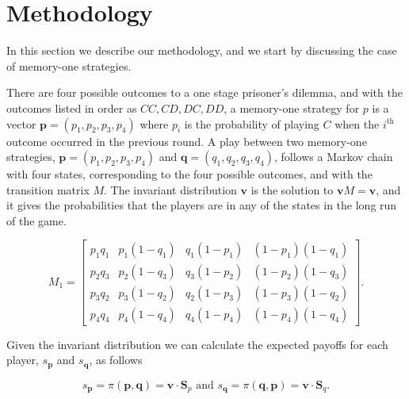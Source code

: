 \documentclass{article}
\theoremstyle{definition}
\begin{document}
\section{Methodology}\label{section:methodology}

In this section we describe our methodology, and we start by discussing
the case of memory-one strategies.

There are four possible outcomes to a one stage prisoner's dilemma, and with the
outcomes listed in order as \(CC, CD, DC, DD\), a memory-one strategy for \(p\)
is a vector \(\mathbf{p} = (p_1, p_2, p_3, p_4)\) where \(p_i\) is the
probability of playing \(C\) when the \(i^{\text{th}}\) outcome occurred in the
previous round. A play between two memory-one strategies, \(\mathbf{p} = (p_1,
p_2, p_3, p_4)\) and \(\mathbf{q} = (q_1, q_2, q_3, q_4)\), follows a Markov
chain with four states, corresponding to the four possible outcomes, and with
the transition matrix \(M\). The invariant distribution \(\mathbf{v}\) is the
solution to \(\mathbf{v} M = \mathbf{v}\), and it gives the probabilities that
the players are in any of the states in the long run of the game.

\begin{equation}
\displaystyle M_1 = \left[\begin{matrix}p_{1} q_{1} & p_{1} \left(1 \!- \!q_{1}\right) & q_{1} \left(1 \!- \!p_{1}\right) & \left(1 \!- \!p_{1}\right) \left(1 \!- \!q_{1}\right)\\
  p_{2} q_{3} & p_{2} \left(1 \!- \!q_{3}\right) & q_{3} \left(1 \!- \!p_{2}\right) & \left(1 \!- \!p_{2}\right) \left(1 \!- \!q_{3}\right)\\
  p_{3} q_{2} & p_{3} \left(1 \!- \!q_{2}\right) & q_{2} \left(1 \!- \!p_{3}\right) & \left(1 \!- \!p_{3}\right) \left(1 \!- \!q_{2}\right)\\
  p_{4} q_{4} & p_{4} \left(1 \!- \!q_{4}\right) & q_{4} \left(1 \!- \!p_{4}\right) & \left(1 \!- \!p_{4}\right) \left(1 \!- \!q_{4}\right)\end{matrix}\right].
\end{equation}

Given the invariant distribution we can calculate the expected payoffs for
each player, \(s_{\mathbf{p}}\) and \(s_{\mathbf{q}}\), as follows~\citep{Nowak:AMC:1989}

\begin{equation*}
  s_{\mathbf{p}} = \pi(\mathbf{p}, \mathbf{q}) = \mathbf{v} \cdot \mathbf{S}_{p} \text{ and } s_{\mathbf{q}} = \pi(\mathbf{q}, \mathbf{p}) = \mathbf{v} \cdot \mathbf{S}_{q}.
\end{equation*}
\end{document}
